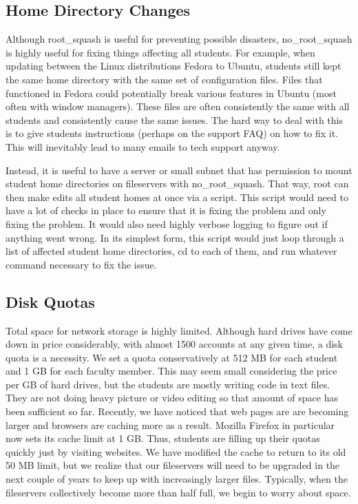 \subsection{Home Directory Changes}
Although root\_squash is useful for preventing possible disasters, no\_root\_squash is highly useful for fixing things affecting all students.  For example, when updating between the Linux distributions Fedora to Ubuntu, students still kept the same home directory with the same set of configuration files.  Files that functioned in Fedora could potentially break various features in Ubuntu (most often with window managers).  These files are often consistently the same with all students and consistently cause the same issues.  The hard way to deal with this is to give students instructions (perhaps on the support FAQ) on how to fix it.  This will inevitably lead to many emails to tech support anyway.

Instead, it is useful to have a server or small subnet that has permission to mount student home directories on fileservers with no\_root\_squash.  That way, root can then make edits all student homes at once via a script.  This script would need to have a lot of checks in place to ensure that it is fixing the problem and only fixing the problem.  It would also need highly verbose logging to figure out if anything went wrong.  In its simplest form, this script would just loop through a list of affected student home directories, cd to each of them, and run whatever command necessary to fix the issue.  

\subsection{Disk Quotas}
Total space for network storage is highly limited.  Although hard drives have come down in price considerably, with almost 1500 accounts at any given time, a disk quota is a necessity.  We set a quota conservatively at 512 MB for each student and 1 GB for each faculty member.  This may seem small considering the price per GB of hard drives, but the students are mostly writing code in text files.  They are not doing heavy picture or video editing so that amount of space has been sufficient so far.  Recently, we have noticed that web pages are are becoming larger and browsers are caching more as a result.  Mozilla Firefox in particular now sets its cache limit at 1 GB.  Thus, students are filling up their quotas quickly just by visiting websites.  We have modified the cache to return to its old 50 MB limit, but we realize that our fileservers will need to be upgraded in the next couple of years to keep up with increasingly larger files.  Typically, when the fileservers collectively become more than half full, we begin to worry about space.  

